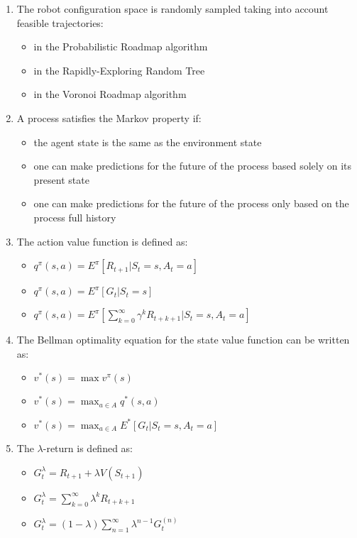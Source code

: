\documentclass[openany]{book}
\theoremstyle{definition}
\theoremstyle{remark}
\begin{document}
\begin{enumerate}
    \item The robot configuration space is randomly sampled taking into account feasible trajectories:
    \begin{itemize}
        \item[] in the Probabilistic Roadmap algorithm
        \item[\checkmark] in the Rapidly-Exploring Random Tree
        \item[] in the Voronoi Roadmap algorithm
    \end{itemize}

    \item A process satisfies the Markov property if:
    \begin{itemize}
        \item[] the agent state is the same as the environment state
        \item[\checkmark] one can make predictions for the future of the process based solely on its present state
        \item[] one can make predictions for the future of the process only based on the process full history
    \end{itemize}

    \item The action value function is defined as:
    \begin{itemize}
        \item[] $q^\pi(s,a) = E^\pi[R_{t+1}|S_t = s, A_t = a]$
        \item[] $q^\pi(s,a) = E^\pi[G_t|S_t = s]$
        \item[\checkmark] $q^\pi(s,a) = E^\pi[\sum_{k=0}^\infty \gamma^k R_{t+k+1}|S_t = s, A_t = a]$
    \end{itemize}

    \item The Bellman optimality equation for the state value function can be written as:
    \begin{itemize}
        \item[] $v^*(s) = \max v^\pi(s)$
        \item[\checkmark] $v^*(s) = \max_{a\in A} q^*(s,a)$
        \item[\checkmark] $v^*(s) = \max_{a\in A} E^*[G_t|S_t = s, A_t = a]$
    \end{itemize}

    \item The $\lambda$-return is defined as:
    \begin{itemize}
        \item[] $G^\lambda_t = R_{t+1} + \lambda V(S_{t+1})$
        \item[] $G^\lambda_t = \sum_{k=0}^\infty \lambda^k R_{t+k+1}$
        \item[\checkmark] $G^\lambda_t = (1-\lambda)\sum_{n=1}^\infty \lambda^{n-1}G^{(n)}_t$
    \end{itemize}


\end{enumerate}
\end{document}
